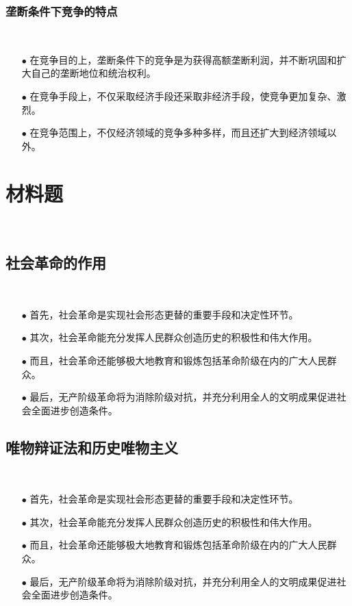 \documentclass{ctexart}
\begin{document}
\subsubsection{垄断条件下竞争的特点}~{}
\vspace{-5mm}
\begin{itemize}
\item[$\bullet$]在竞争目的上，垄断条件下的竞争是为获得高额垄断利润，并不断巩固和扩大自己的垄断地位和统治权利。
\item[$\bullet$]在竞争手段上，不仅采取经济手段还采取非经济手段，使竞争更加复杂、激烈。
\item[$\bullet$]在竞争范围上，不仅经济领域的竞争多种多样，而且还扩大到经济领域以外。
\end{itemize}

\newpage
\section{材料题}~{}
\subsection{社会革命的作用}~{}
\vspace{-5mm}
\begin{itemize}
\item[$\bullet$]首先，社会革命是实现社会形态更替的重要手段和决定性环节。
\item[$\bullet$]其次，社会革命能充分发挥人民群众创造历史的积极性和伟大作用。
\item[$\bullet$]而且，社会革命还能够极大地教育和锻炼包括革命阶级在内的广大人民群众。
\item[$\bullet$]最后，无产阶级革命将为消除阶级对抗，并充分利用全人的文明成果促进社会全面进步创造条件。 
\end{itemize}

\subsection{唯物辩证法和历史唯物主义}~{}
\vspace{-5mm}
\begin{itemize}
\item[$\bullet$]首先，社会革命是实现社会形态更替的重要手段和决定性环节。
\item[$\bullet$]其次，社会革命能充分发挥人民群众创造历史的积极性和伟大作用。
\item[$\bullet$]而且，社会革命还能够极大地教育和锻炼包括革命阶级在内的广大人民群众。
\item[$\bullet$]最后，无产阶级革命将为消除阶级对抗，并充分利用全人的文明成果促进社会全面进步创造条件。 
\end{itemize}
\end{document}
